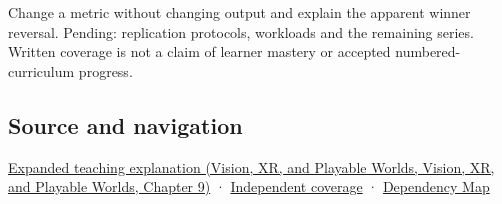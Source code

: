 Change a metric without changing output and explain the apparent winner reversal. Pending: replication protocols, workloads and the remaining series. Written coverage is not a claim of learner mastery or accepted numbered-curriculum progress.

\subsection{Source and navigation}\label{appendix-65788587ef78-source-and-navigation}

\href{../07-Vision-XR-and-Playable-Worlds/main.pdf\#nameddest=04-visual-computing-ii-ch042-make-the-mathematics-operational-without-pretending-to-run-a-human-study}{Expanded teaching explanation (Vision, XR, and Playable Worlds, Vision, XR, and Playable Worlds, Chapter 9)} · \hyperref[appendix-fd090d982a15-xr01---independent-seeing-and-representation-source]{Independent coverage} · \hyperref[appendix-4ad47bdd269a]{Dependency Map}
